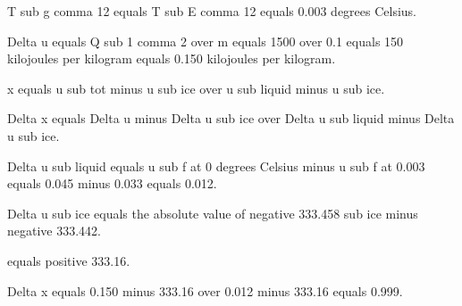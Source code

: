 T sub g comma 12 equals T sub E comma 12 equals 0.003 degrees Celsius.

Delta u equals Q sub 1 comma 2 over m equals 1500 over 0.1 equals 150 kilojoules per kilogram equals 0.150 kilojoules per kilogram.

x equals u sub tot minus u sub ice over u sub liquid minus u sub ice.

Delta x equals Delta u minus Delta u sub ice over Delta u sub liquid minus Delta u sub ice.

Delta u sub liquid equals u sub f at 0 degrees Celsius minus u sub f at 0.003 equals 0.045 minus 0.033 equals 0.012.

Delta u sub ice equals the absolute value of negative 333.458 sub ice minus negative 333.442.

equals positive 333.16.

Delta x equals 0.150 minus 333.16 over 0.012 minus 333.16 equals 0.999.